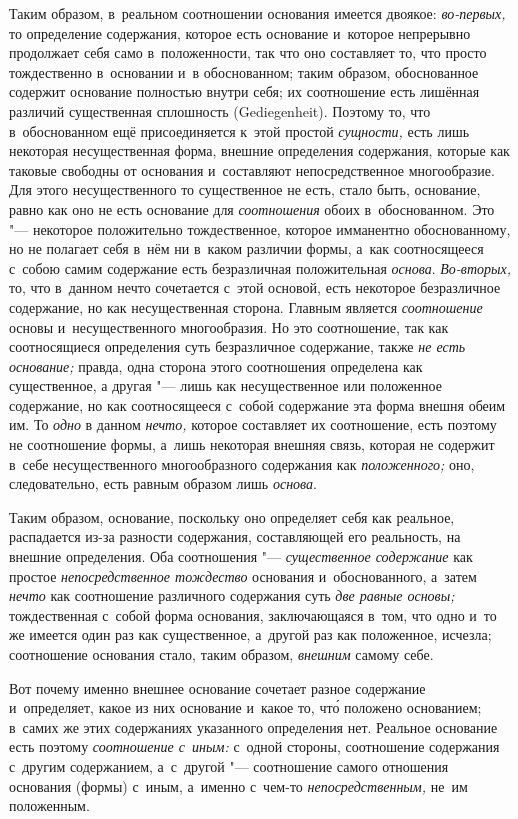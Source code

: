 Таким образом, в~реальном соотношении основания имеется двоякое:
{\em во-первых,} то определение содержания, которое есть основание и~которое
непрерывно продолжает себя само в~положенности, так что оно составляет то, что
просто тождественно в~основании и~в обоснованном; таким образом, обоснованное
содержит основание полностью внутри себя; их соотношение есть лишённая различий
существенная сплошность (Gedie\-gen\-heit). Поэтому то, что в~обоснованном ещё
присоединяется к~этой простой {\em сущности,} есть лишь некоторая
несущественная форма, внешние определения содержания, которые как таковые
свободны от основания и~составляют непосредственное многообразие. Для этого
несущественного то существенное не есть, стало быть, основание, равно как оно
не есть основание для {\em соотношения} обоих в~обоснованном. Это "---
некоторое положительно тождественное, которое имманентно обоснованному, но не
полагает себя в~нём ни в~каком различии формы, а~как соотносящееся с~собою
самим содержание есть безразличная положительная {\em основа}. {\em Во-вторых,}
то, что в~данном нечто сочетается с~этой основой, есть некоторое безразличное
содержание, но как несущественная сторона. Главным является {\em соотношение}
основы и~несущественного многообразия. Но это соотношение, так как
соотносящиеся определения суть безразличное содержание, также {\em не есть
основание;} правда, одна сторона этого соотношения определена как существенное,
а другая "--- лишь как несущественное или положенное содержание, но как
соотносящееся с~собой содержание эта форма внешня обеим им. То {\em одно}
в данном {\em нечто,} которое составляет их соотношение, есть поэтому не
соотношение формы, а~лишь некоторая внешняя связь, которая не содержит в~себе
несущественного многообразного содержания как {\em положенного;} оно,
следовательно, есть равным образом лишь {\em основа}.

Таким образом, основание, поскольку оно определяет себя как реальное,
распадается из-за разности содержания, составляющей его реальность, на внешние
определения. Оба соотношения "--- {\em существенное содержание} как простое
{\em непосредственное тождество} основания и~обоснованного, а~затем {\em нечто}
как соотношение различного содержания суть {\em две равные основы;}
тождественная с~собой форма основания, заключающаяся в~том, что одно и~то же
имеется один раз как существенное, а~другой раз как положенное, исчезла;
соотношение основания стало, таким образом, {\em внешним} самому себе.

Вот почему именно внешнее основание сочетает разное содержание и~определяет,
какое из них основание и~какое то, чт\'{о} положено основанием; в~самих же
этих содержаниях указанного определения нет. Реальное основание есть поэтому
{\em соотношение с~иным:} с~одной стороны, соотношение содержания с~другим
содержанием, а~с~другой "--- соотношение самого отношения основания (формы)
с~иным, а~именно с~чем-то {\em непосредственным,} не~им положенным.

